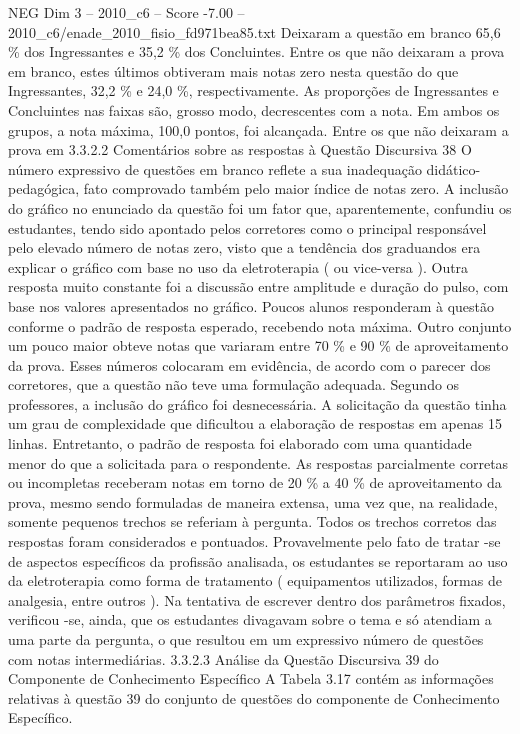 \begin{textsample}{NEG Dim 3 – 2010\_c6 – Score -7.00 – 2010\_c6/enade\_2010\_fisio\_fd971bea85.txt}
Deixaram a questão em branco 65,6 \% dos Ingressantes e 35,2 \% dos Concluintes.
Entre os que não deixaram a prova em branco, estes últimos obtiveram mais notas zero nesta questão do que Ingressantes, 32,2 \% e 24,0 \%, respectivamente.
As proporções de Ingressantes e Concluintes nas faixas são, grosso modo, decrescentes com a nota.
Em ambos os grupos, a nota máxima, 100,0 pontos, foi alcançada.
Entre os que não deixaram a prova em 3.3.2.2 Comentários sobre as respostas à Questão Discursiva 38 O número expressivo de questões em branco reflete a sua inadequação didático-pedagógica, fato comprovado também pelo maior índice de notas zero.
A inclusão do gráfico no enunciado da questão foi um fator que, aparentemente, confundiu os estudantes, tendo sido apontado pelos corretores como o principal responsável pelo elevado número de notas zero, visto que a tendência dos graduandos era explicar o gráfico com base no uso da eletroterapia ( ou vice-versa ).
Outra resposta muito constante foi a discussão entre amplitude e duração do pulso, com base nos valores apresentados no gráfico.
Poucos alunos responderam à questão conforme o padrão de resposta esperado, recebendo nota máxima.
Outro conjunto um pouco maior obteve notas que variaram entre 70 \% e 90 \% de aproveitamento da prova.
Esses números colocaram em evidência, de acordo com o parecer dos corretores, que a questão não teve uma formulação adequada.
Segundo os professores, a inclusão do gráfico foi desnecessária.
A solicitação da questão tinha um grau de complexidade que dificultou a elaboração de respostas em apenas 15 linhas.
Entretanto, o padrão de resposta foi elaborado com uma quantidade menor do que a solicitada para o respondente.
As respostas parcialmente corretas ou incompletas receberam notas em torno de 20 \% a 40 \% de aproveitamento da prova, mesmo sendo formuladas de maneira extensa, uma vez que, na realidade, somente pequenos trechos se referiam à pergunta.
Todos os trechos corretos das respostas foram considerados e pontuados.
Provavelmente pelo fato de tratar -se de aspectos específicos da profissão analisada, os estudantes se reportaram ao uso da eletroterapia como forma de tratamento ( equipamentos utilizados, formas de analgesia, entre outros ).
Na tentativa de escrever dentro dos parâmetros fixados, verificou -se, ainda, que os estudantes divagavam sobre o tema e só atendiam a uma parte da pergunta, o que resultou em um expressivo número de questões com notas intermediárias. 3.3.2.3 Análise da Questão Discursiva 39 do Componente de Conhecimento Específico A Tabela 3.17 contém as informações relativas à questão 39 do conjunto de questões do componente de Conhecimento Específico.

\end{textsample}
